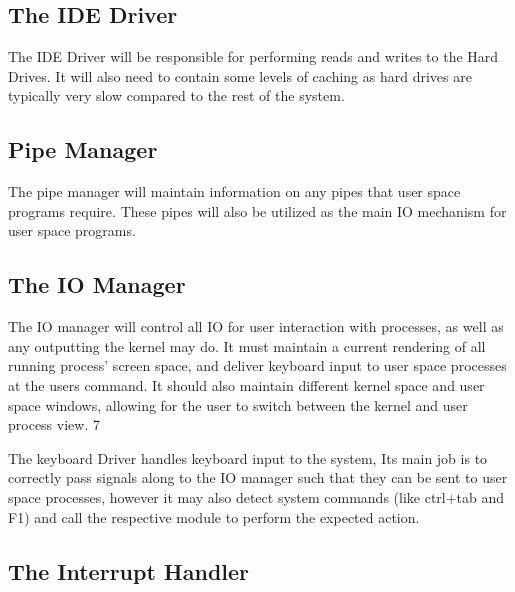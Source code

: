 \documentclass[a4paper]{report}
\begin{document}
\subsection{The IDE Driver}

The IDE Driver will be responsible for performing reads and writes to the Hard Drives. It will also need to contain some levels of caching as hard drives are typically very slow compared to the rest of the system.

\subsection{Pipe Manager}

The pipe manager will maintain information on any pipes that user space programs require. These pipes will also be utilized as the main IO mechanism for user space programs.

\subsection{The IO Manager}

The IO manager will control all IO for user interaction with processes, as well as any outputting the kernel may do. It must maintain a current rendering of all running process' screen space, and deliver keyboard input to user space processes at the users command. It should also maintain different kernel space and user space windows, allowing for the user to switch between the kernel and user process view.
7

The keyboard Driver handles keyboard input to the system, Its main job is to correctly pass signals along to the IO manager such that they can be sent to user space processes, however it may also detect system commands (like ctrl+tab and F1) and call the respective module to perform the expected action.

\subsection{The Interrupt Handler}
\end{document}
